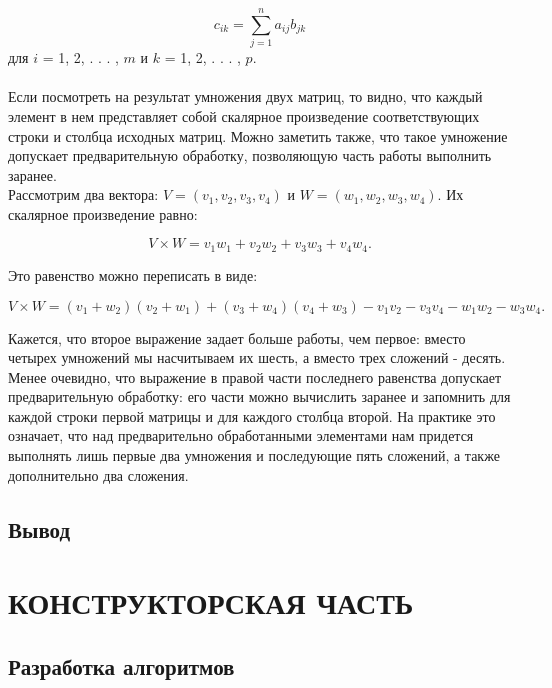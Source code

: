 \documentclass[a4paper,12pt]{article}
\begin{document}
\begin{equation}
c_{ik} = \sum \limits_{j=1}^{n} a_{ij}b_{jk}
\end{equation}
для $i$ = 1, 2, . . . , $m$ и $k$ = 1, 2, . . . , $p$. \\
\\
Если посмотреть на результат умножения двух матриц, то видно, что каждый элемент в нем представляет собой скалярное произведение соответствующих строки и столбца исходных матриц. Можно заметить также, что такое умножение допускает предварительную обработку, позволяющую часть работы выполнить заранее. \\
Рассмотрим два вектора: $V = (v_1, v_2, v_3, v_4)$ и $W = (w_1, w_2, w_3, w_4)$. Их скалярное произведение равно:
\begin{center}
\begin{equation}
V × W = v_1w_1 + v_2w_2 + v_3w_3 + v_4w_4.
\end{equation}
\end{center}
Это равенство можно переписать в виде:
\begin{center}
\begin{equation}
V × W = (v_1 + w_2)(v_2 + w_1) + (v_3 + w_4)(v_4 + w_3) - v_1v_2 - v_3v_4 - w_1w_2 - w_3w_4.
\end{equation}
\end{center}
Кажется, что второе выражение задает больше работы, чем первое: вместо четырех умножений мы насчитываем их шесть, а вместо трех сложений - десять. Менее очевидно, что выражение в правой части последнего равенства допускает предварительную обработку: его части можно вычислить заранее и запомнить для каждой строки первой матрицы и для каждого столбца второй. На практике это означает, что над предварительно обработанными элементами нам придется выполнять лишь первые два умножения и последующие пять сложений, а также дополнительно два сложения. 

\newpage
\subsection{Вывод}


\newpage
\section{КОНСТРУКТОРСКАЯ ЧАСТЬ}

\subsection{Разработка алгоритмов}
\end{document}
